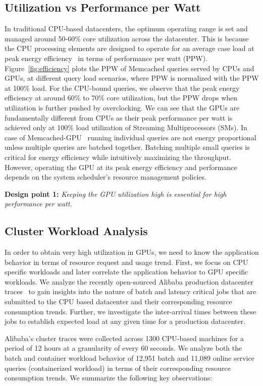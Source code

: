 \subsection{Utilization vs Performance per Watt}
In traditional CPU-based datacenters, the optimum operating range is set and managed around 50-60\% core utilization across the datacenter. This is because the CPU processing elements are designed to operate for an average case load at peak energy efficiency~\cite{wong2016peak} in terms of performance per watt (PPW). Figure~\ref{fig:efficiency} plots the PPW of Memcached queries served by CPUs and GPUs, at different query load scenarios, where PPW is normalized with the PPW at 100\% load. For the CPU-bound queries, we observe that the peak energy efficiency at around 60\% to 70\% core utilization, but the PPW drops when utilization is further pushed by overclocking. We can see that the GPUs are fundamentally different from CPUs as their peak performance per watt is achieved only at 100\% load utilization of Streaming Multiprocessors (SMs). In case of Memcached-GPU~\cite{memcachedgpu} running individual queries are not energy proportional unless multiple queries are batched together. Batching multiple small queries is critical for energy efficiency while intuitively maximizing the throughput. However, operating the GPU at its peak energy efficiency and performance depends on the system scheduler's resource management policies.

\textbf{Design point 1:} \textit{Keeping the GPU utilization high is essential for high performance per watt.} 

\subsection{Cluster Workload Analysis}
In order to obtain very high utilization in GPUs, we need to know the application behavior in terms of resource request and usage trend. First, we focus on CPU specific workloads and later correlate the application behavior to GPU specific workloads. We analyze the recently open-sourced Alibaba production datacenter traces~\cite{baba} to gain insights into the nature of batch and latency critical jobs that are submitted to the CPU based datacenter and their corresponding resource consumption trends. Further, we investigate the inter-arrival times between these jobs to establish expected load at any given time for a production datacenter.

Alibaba's cluster traces were collected across 1300 CPU-based machines for a period of 12 hours at a granularity of every 60 seconds. We analyze both the batch and container workload behavior of 12,951 batch and 11,089 online service queries (containerized workload) in terms of their corresponding resource consumption trends. We summarize the following key observations: 

